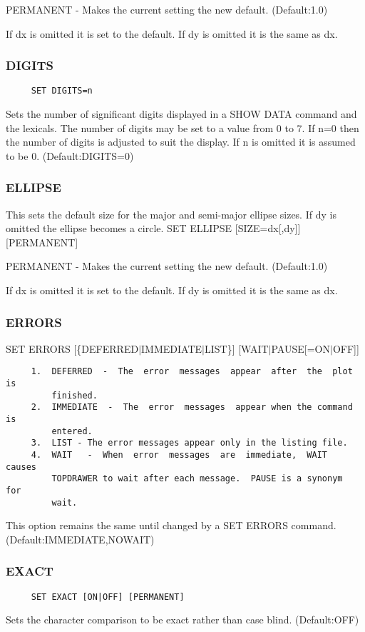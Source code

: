 PERMANENT - Makes the current setting the new default.  
(Default:1.0) 

If  dx is omitted it is set to the default.  If dy is omitted it is the
same as dx.  
\subsubsection{DIGITS}
\begin{verbatim}
     SET DIGITS=n 
\end{verbatim}

Sets  the number of significant digits displayed in a SHOW DATA command
and the lexicals.  The number of digits may be set to a value from 0 to
7.   If  n=0 then the number of digits is adjusted to suit the display.
If n is omitted it is assumed to be 0.  (Default:DIGITS=0) 
\subsubsection{ELLIPSE}
This  sets the default size for the major and semi-major ellipse sizes.
If dy is omitted the ellipse becomes a circle.  
SET ELLIPSE [SIZE=dx[,dy]] [PERMANENT] 

PERMANENT - Makes the current setting the new default.  
(Default:1.0) 

If  dx is omitted it is set to the default.  If dy is omitted it is the
same as dx.  
\subsubsection{ERRORS}
SET ERRORS [\{DEFERRED$|$IMMEDIATE$|$LIST\}] [WAIT$|$PAUSE[=ON$|$OFF]] 

\begin{verbatim}
     1.  DEFERRED  -  The  error  messages  appear  after  the  plot is
         finished.  
     2.  IMMEDIATE  -  The  error  messages  appear when the command is
         entered.  
     3.  LIST - The error messages appear only in the listing file.  
     4.  WAIT   -  When  error  messages  are  immediate,  WAIT  causes
         TOPDRAWER to wait after each message.  PAUSE is a synonym  for
         wait.  
\end{verbatim}

This option remains the same until changed by a SET ERRORS command.  
(Default:IMMEDIATE,NOWAIT) 
\subsubsection{EXACT}
\begin{verbatim}
     SET EXACT [ON|OFF] [PERMANENT] 
\end{verbatim}
Sets the character comparison to be exact rather than case blind.  
(Default:OFF) 
